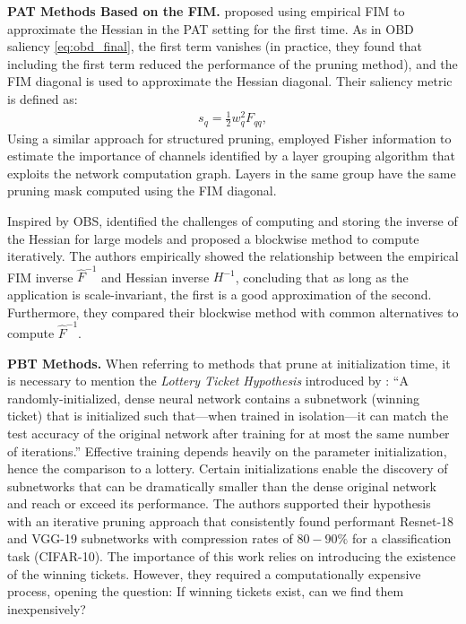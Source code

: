 \textbf{PAT Methods Based on the FIM.} \citet{theis2018faster} proposed using empirical FIM to approximate the Hessian in the PAT setting for the first time. As in OBD saliency \eqref{eq:obd_final}, the first term vanishes (in practice, they found that including the first term reduced the performance of the pruning method), and the FIM diagonal is used to approximate the Hessian diagonal. Their saliency metric is defined as:
\begin{align}
    s_q = \frac{1}{2} w_q^2 F_{qq}, 
    \label{eq:faster_gaze_fisher}
\end{align}
Using a similar approach for structured pruning, \citet{liu2021group} employed Fisher information to estimate the importance of channels identified by a layer grouping algorithm that exploits the network computation graph. Layers in the same group have the same pruning mask computed using the FIM diagonal.

Inspired by OBS, \citet{singh2020woodfisher} identified the challenges of computing and storing the inverse of the Hessian for large models and proposed a blockwise method to compute iteratively. The authors empirically showed the relationship between the empirical FIM inverse $\hat{F}^{-1}$ and Hessian inverse $H^{-1}$, concluding that as long as the application is scale-invariant, the first is a good approximation of the second. Furthermore, they compared their blockwise method with common alternatives to compute $\hat{F}^{-1}$.

\textbf{PBT Methods.} When referring to methods that prune at initialization time, it is necessary to mention the \textit{Lottery Ticket Hypothesis} introduced by \citet{frankle2018lottery}: ``A randomly-initialized, dense neural network contains a subnetwork (winning ticket) that is initialized such that—when trained in isolation—it can match the test accuracy of the original network after training for at most the same number of iterations.'' Effective training depends heavily on the parameter initialization, hence the comparison to a lottery. Certain initializations enable the discovery of subnetworks that can be dramatically smaller than the dense original network and reach or exceed its performance. The authors supported their hypothesis with an iterative pruning approach that consistently found performant Resnet-18 and VGG-19 subnetworks with compression rates of $80-90\%$ for a classification task (CIFAR-10). The importance of this work relies on introducing the existence of the winning tickets. However, they required a computationally expensive process, opening the question: If winning tickets exist, can we find them inexpensively?

